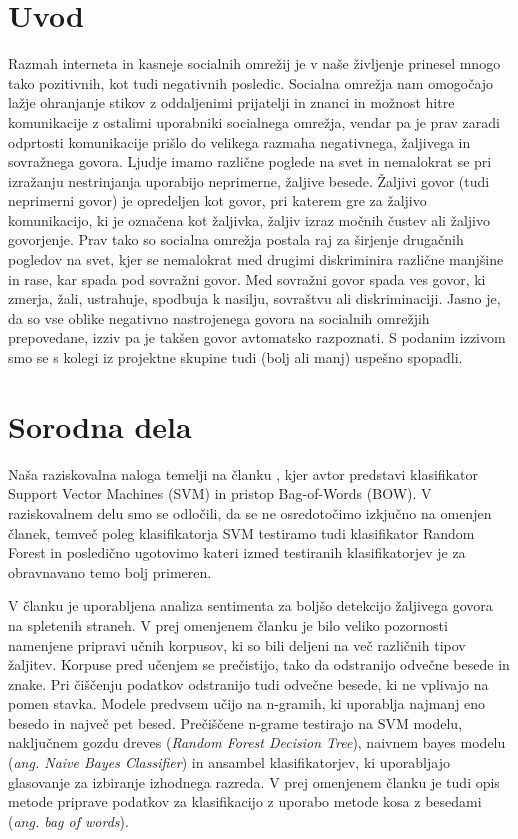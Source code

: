 \documentclass{acm_proc_article-sp}
\begin{document}

\section{Uvod}
Razmah interneta in kasneje socialnih omrežij je v naše življenje prinesel mnogo tako pozitivnih, kot tudi negativnih posledic. 
Socialna omrežja nam omogočajo lažje ohranjanje stikov z oddaljenimi prijatelji in znanci in možnost hitre komunikacije z ostalimi uporabniki socialnega omrežja, vendar pa je prav zaradi odprtosti komunikacije prišlo do velikega razmaha negativnega, žaljivega in sovražnega govora.
Ljudje imamo različne poglede na svet in nemalokrat se pri izražanju nestrinjanja uporabijo neprimerne, žaljive besede. Žaljivi govor (tudi neprimerni govor) je opredeljen kot govor, pri katerem gre za žaljivo komunikacijo, ki je označena kot žaljivka, žaljiv izraz močnih čustev ali žaljivo govorjenje.
Prav tako so socialna omrežja postala raj za širjenje drugačnih pogledov na svet, kjer se nemalokrat med drugimi diskriminira različne manjšine in rase, kar spada pod sovražni govor.
Med sovražni govor spada ves govor, ki zmerja, žali, ustrahuje, spodbuja k nasilju, sovraštvu ali diskriminaciji. Jasno je, da so vse oblike negativno nastrojenega govora na socialnih omrežjih prepovedane, izziv pa je takšen govor avtomatsko razpoznati.
S podanim izzivom smo se s kolegi iz projektne skupine tudi (bolj ali manj) uspešno spopadli.

\section{Sorodna dela}
Naša raziskovalna naloga temelji na članku \cite{Greevy:2004:CRT:1008992.1009074}, kjer avtor predstavi klasifikator Support Vector Machines (SVM) in pristop Bag-of-Words (BOW). V raziskovalnem delu smo se odločili, da se ne osredotočimo izkjučno na omenjen članek, temveč poleg klasifikatorja SVM testiramo tudi klasifikator Random Forest in posledično ugotovimo kateri izmed testiranih klasifikatorjev je za obravnavano temo bolj primeren. 

V članku \cite{POI3:POI385} je uporabljena analiza sentimenta za boljšo detekcijo žaljivega govora na spletenih straneh.
V prej omenjenem članku je bilo veliko pozornosti namenjene pripravi učnih korpusov, ki so bili deljeni na več različnih tipov žaljitev.
Korpuse pred učenjem se prečistijo, tako da odstranijo odvečne besede in znake.
Pri čiščenju podatkov odstranijo tudi odvečne besede, ki ne vplivajo na pomen stavka.
Modele predvsem učijo na n-gramih, ki uporablja najmanj eno besedo in največ pet besed.
Prečiščene n-grame testirajo na SVM modelu, naključnem gozdu dreves ({\it Random Forest Decision Tree}), naivnem bayes modelu ({\it ang. Naive Bayes Classifier}) in ansambel klasifikatorjev, ki uporabljajo glasovanje za izbiranje izhodnega razreda.
V prej omenjenem članku je tudi opis metode priprave podatkov za klasifikacijo z uporabo metode kosa z besedami ({\it ang. bag of words}).
\end{document}
